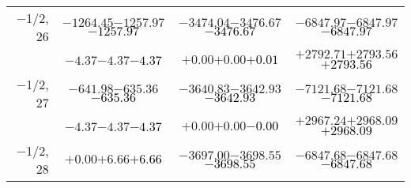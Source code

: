 \documentclass[compress]{beamer}
\begin{document}
\begin{frame}
{\begin{tabular}{r | c | c | c}
$-$1/2, 26 & $-1264.45$\hspace{0.1 cm}$-1257.97$\hspace{0.1 cm}\textcolor{black}{$-1257.97$} & $-3474.04$\hspace{0.1 cm}$-3476.67$\hspace{0.1 cm}\textcolor{black}{$-3476.67$} & $-6847.97$\hspace{0.1 cm}$-6847.97$\hspace{0.1 cm}\textcolor{black}{$-6847.97$} \\
           & $-4.37$\hspace{0.1 cm}$-4.37$\hspace{0.1 cm}\textcolor{black}{$-4.37$} & $+0.00$\hspace{0.1 cm}$+0.00$\hspace{0.1 cm}\textcolor{black}{$+0.01$} & $+2792.71$\hspace{0.1 cm}$+2793.56$\hspace{0.1 cm}\textcolor{black}{$+2793.56$} \\
$-$1/2, 27 & $-641.98$\hspace{0.1 cm}$-635.36$\hspace{0.1 cm}\textcolor{black}{$-635.36$} & $-3640.83$\hspace{0.1 cm}$-3642.93$\hspace{0.1 cm}\textcolor{black}{$-3642.93$} & $-7121.68$\hspace{0.1 cm}$-7121.68$\hspace{0.1 cm}\textcolor{black}{$-7121.68$} \\
           & $-4.37$\hspace{0.1 cm}$-4.37$\hspace{0.1 cm}\textcolor{black}{$-4.37$} & $+0.00$\hspace{0.1 cm}$+0.00$\hspace{0.1 cm}\textcolor{black}{$-0.00$} & $+2967.24$\hspace{0.1 cm}$+2968.09$\hspace{0.1 cm}\textcolor{black}{$+2968.09$} \\
$-$1/2, 28 & $+0.00$\hspace{0.1 cm}$+6.66$\hspace{0.1 cm}\textcolor{black}{$+6.66$} & $-3697.00$\hspace{0.1 cm}$-3698.55$\hspace{0.1 cm}\textcolor{black}{$-3698.55$} & $-6847.68$\hspace{0.1 cm}$-6847.68$\hspace{0.1 cm}\textcolor{black}{$-6847.68$} \\

\end{tabular}}
\end{frame}
\end{document}
